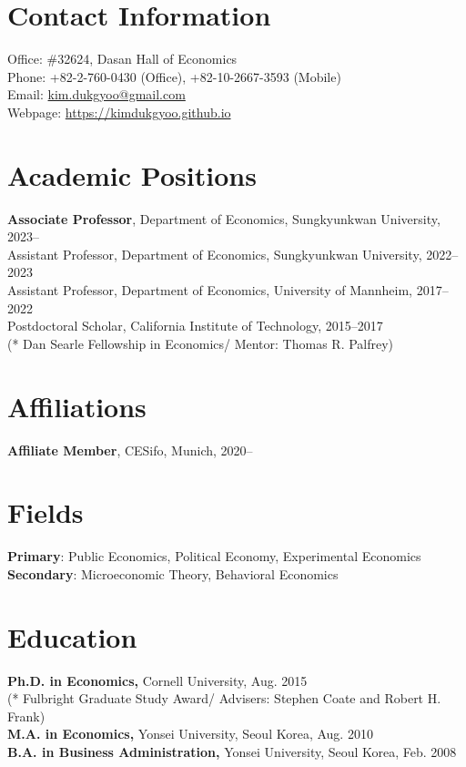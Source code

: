 \documentclass[margin, a4paper]{res}
\begin{document}
 

\begin{resume} 
\section{Contact Information} Office: \#32624, Dasan Hall of Economics\\
Phone: +82-2-760-0430 (Office), +82-10-2667-3593 (Mobile)\\
Email: \href{mailto:kim.dukgyoo@gmail.com}{kim.dukgyoo@gmail.com}\\
Webpage: \url{https://kimdukgyoo.github.io}

\section{Academic Positions}
\textbf{Associate Professor}, Department of Economics, Sungkyunkwan University, 2023--\\
{Assistant Professor}, Department of Economics, Sungkyunkwan University, 2022--2023\\
{Assistant Professor}, Department of Economics, University of Mannheim, 2017--2022\\
{Postdoctoral Scholar}, California Institute of Technology, 2015--2017\\
(* Dan Searle Fellowship in Economics/ Mentor: Thomas R. Palfrey)

\section{Affiliations}
\textbf{Affiliate Member}, CESifo, Munich, 2020--

\section{Fields}
\textbf{Primary}: Public Economics, Political Economy, Experimental Economics\\
\textbf{Secondary}: Microeconomic Theory, Behavioral Economics

\section{Education} 
\textbf{Ph.D. in Economics,} Cornell University, Aug. 2015\\
(* Fulbright Graduate Study Award/ Advisers: Stephen Coate and Robert H. Frank)\\
\textbf{M.A. in Economics,} Yonsei University, Seoul Korea,  Aug. 2010\\
\textbf{B.A. in Business Administration,} Yonsei University, Seoul Korea, Feb. 2008


\end{resume}
\end{document}
